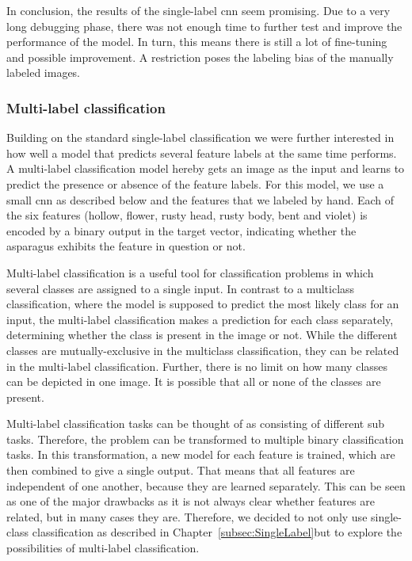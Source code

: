 \bigskip
In conclusion, the results of the single-label  \acrshort{cnn} seem promising. Due to a very long debugging phase, there was not enough time to further test and improve the performance of the model. In turn, this means there is still a lot of fine-tuning and possible improvement. A restriction poses the labeling bias of the manually labeled images.

\subsubsection{Multi-label classification}
\label{subsec:MultiLabel}

Building on the standard single-label classification we were further interested in how well a model that predicts several feature labels at the same time performs. A multi-label classification model hereby gets an image as the input and learns to predict the presence or absence of  the feature labels.
For this model, we use a small  \acrshort{cnn} as described below and the features that we labeled by hand. Each of the six features (hollow, flower, rusty head, rusty body, bent and violet) is encoded by a binary output in the target vector, indicating whether the asparagus exhibits the feature in question or not.

\bigskip
Multi-label classification is a useful tool for classification problems in which several classes are assigned to a single input. In contrast to a multiclass classification, where the model is supposed to predict the most likely class for an input, the multi-label classification makes a prediction for each class separately, determining whether the class is present in the image or not. While the different classes are mutually-exclusive in the multiclass classification, they can be related in the multi-label classification. Further, there is no limit on how many classes can be depicted in one image. It is possible that all or none of the classes are present.

Multi-label classification tasks can be thought of as consisting of different sub tasks. Therefore, the problem can be transformed to multiple binary classification tasks. In this transformation, a new model for each feature is trained, which are then combined to give a single output. That means that all features are independent of one another, because they are learned separately. This can be seen as one of the major drawbacks as it is not always clear whether features are related, but in many cases they are.
Therefore, we decided to not only use single-class classification as described in Chapter~\ref{subsec:SingleLabel}but to explore the possibilities of multi-label classification.

